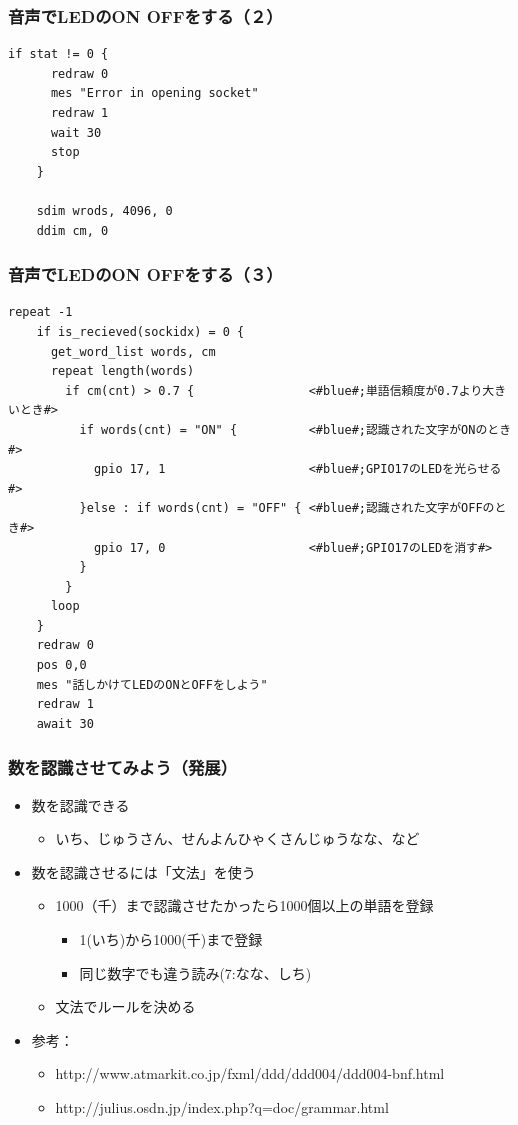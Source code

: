 \documentclass[14pt]{beamer}
\begin{document}
\begin{frame}[fragile]
  \frametitle{音声でLEDのON OFFをする（２）}
  \begin{lstlisting}[caption=ledvoice.hsp,label=ledvoice.hsp]
    if stat != 0 {
      redraw 0
      mes "Error in opening socket"
      redraw 1
      wait 30
      stop
    }

    sdim wrods, 4096, 0
    ddim cm, 0
  \end{lstlisting}
\end{frame}

\begin{frame}[fragile]
  \frametitle{音声でLEDのON OFFをする（３）}
  \begin{lstlisting}[caption=ledvoice.hsp,label=ledvoice.hsp,basicstyle=\scriptsize]
    repeat -1
    if is_recieved(sockidx) = 0 {
      get_word_list words, cm
      repeat length(words)
        if cm(cnt) > 0.7 {                <#blue#;単語信頼度が0.7より大きいとき#>
          if words(cnt) = "ON" {          <#blue#;認識された文字がONのとき#>
            gpio 17, 1                    <#blue#;GPIO17のLEDを光らせる#>
          }else : if words(cnt) = "OFF" { <#blue#;認識された文字がOFFのとき#>
            gpio 17, 0                    <#blue#;GPIO17のLEDを消す#>
          }
        }
      loop
    }
    redraw 0
    pos 0,0
    mes "話しかけてLEDのONとOFFをしよう"
    redraw 1
    await 30
  \end{lstlisting}
\end{frame}

\begin{frame}
  \frametitle{数を認識させてみよう（発展）}
  \begin{itemize}
    \item 数を認識できる
    \begin{itemize}
      \item いち、じゅうさん、せんよんひゃくさんじゅうなな、など
    \end{itemize}
    \item 数を認識させるには「文法」を使う
    \begin{itemize}
      \item 1000（千）まで認識させたかったら1000個以上の単語を登録
      \begin{itemize}
        \item 1(いち)から1000(千)まで登録
        \item 同じ数字でも違う読み(7:なな、しち)
      \end{itemize}
      \item 文法でルールを決める
    \end{itemize}
    \item 参考：
    \begin{itemize}
      \item http://www.atmarkit.co.jp/fxml/ddd/ddd004/ddd004-bnf.html
      \item http://julius.osdn.jp/index.php?q=doc/grammar.html
    \end{itemize}
  \end{itemize}
\end{frame}
\end{document}
